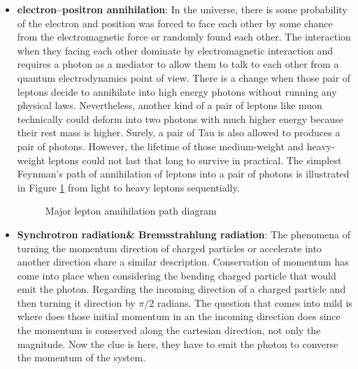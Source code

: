 \begin{itemize}
    \item \textbf{electron–positron annihilation}:
    In the universe, there is some probability of the electron and position was forced to face each other by some chance from the electromagnetic force or randomly found each other.
    The interaction when they facing each other dominate by electromagnetic interaction and requires a photon as a mediator to allow them to talk to each other from a quantum electrodynamics point of view. There is a change 
    when those pair of leptons decide to annihilate into high energy photons
    without running any physical laws. Nevertheless, another kind of
    a pair of leptons like muon technically could deform into two
    photons with much higher energy because their rest mass is higher.
    Surely, a pair of Tau is also allowed to produces a pair of photons.
    However, the lifetime of those medium-weight and heavy-weight leptons could not last that long to survive in practical. The simplest 
    Feynman's path of annihilation of leptons into a pair of photons 
    is illustrated in Figure \ref{fig:lepton_annihilation} from light 
    to heavy leptons sequentially.

    \begin{figure}[h!]
        \centering
            \hfill
            \hfill
            \caption{Major lepton annihilation path diagram}
           \label{fig:lepton_annihilation}
    \end{figure}

    \item \textbf{Synchrotron radiation\& Bremsstrahlung radiation}:
    The phenomena of turning the momentum direction of charged particles or accelerate into another direction share a similar description. Conservation of momentum has come into place when considering the bending charged particle that would emit the photon. Regarding the incoming direction of a charged particle and then turning it direction by $\pi/2$ radians. The question
    that comes into mild is where does those initial momentum in an 
    the incoming direction does since the momentum is conserved along 
    the cartesian direction, not only the magnitude. Now the clue is 
    here, they have to emit the photon to converse the momentum of 
    the system.
    

\end{itemize}
